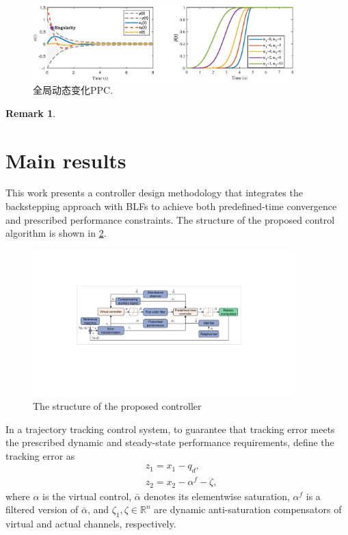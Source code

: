 \documentclass[pdflatex,sn-mathphys-num]{sn-jnl}%
\theoremstyle{thmstyleone}%
\theoremstyle{thmstyletwo}%
\newtheorem{remark}{Remark}%
\theoremstyle{thmstylethree}%
\begin{document}
\begin{figure}[H]
	\centering
	\includegraphics[width=0.9\textwidth]{fig1.eps}
	\caption{全局动态变化PPC.}
	\label{fig:1}
\end{figure}
\begin{remark}
	\end{remark}
	



\section{Main results}


This work presents a controller design methodology that integrates the backstepping approach with BLFs to achieve both predefined-time convergence and prescribed performance constraints. The structure of the proposed control algorithm is shown in \cref{fig:2}.
\begin{figure}[H]
	\centering
	\includegraphics[width=0.9\textwidth]{fig2.pdf}
	\caption{The structure of the proposed controller}
	\label{fig:2}
\end{figure}



\par In a trajectory tracking control system, to  guarantee that tracking error meets the prescribed dynamic and steady-state performance requirements, define the tracking error as
\begin{subequations}\label{eq:20}
	\begin{align}
		&z_{1} = x_{1} - q_{d}, \\
	  &z_{2} = x_{2} -\alpha^{f}-\zeta,
	\end{align}
	\end{subequations}
	where $\alpha$ is the virtual control, $\bar{\alpha}$ denotes its elementwise saturation, $\alpha^{f}$ is a filtered version of $\bar{\alpha}$, and $\zeta_{1},\zeta \in\mathbb{R}^{n}$ are dynamic anti-saturation compensators of virtual and actual channels, respectively.
\end{document}

